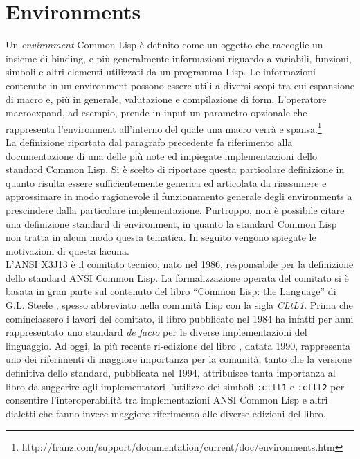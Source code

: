 \section{Environments}

Un \textit{environment} Common Lisp è definito come un oggetto che raccoglie un
insieme di binding, e più generalmente informazioni riguardo a variabili,
funzioni, simboli e altri elementi utilizzati da un programma Lisp. Le
informazioni contenute in un environment possono essere utili a diversi scopi
tra cui espansione di macro e, più in generale, valutazione e compilazione di
form. L’operatore macroexpand, ad esempio, prende in input un parametro
opzionale che rappresenta l’environment all’interno del quale una macro verrà e
spansa.\footnote{http://franz.com/support/documentation/current/doc/environments.htm}\\

La definizione riportata dal paragrafo precedente fa riferimento alla
documentazione di una delle più note ed impiegate implementazioni dello
standard Common Lisp. Si è scelto di riportare questa particolare definizione
in quanto risulta essere sufficientemente generica ed articolata da riassumere
e approssimare in modo ragionevole il funzionamento generale degli environments
a prescindere dalla particolare implementazione. Purtroppo, non è possibile
citare una definizione standard di environment, in quanto la standard Common
Lisp non tratta in alcun modo questa tematica. In seguito vengono spiegate le
motivazioni di questa lacuna.\\

L’ANSI X3J13 è il comitato tecnico, nato nel 1986, responsabile per la
definizione dello standard ANSI Common Lisp. La formalizzazione operata del
comitato si è basata in gran parte sul contenuto del libro “Common Lisp: the
Language” di G.L. Steele \cite{steele1984common}, spesso abbreviato nella
comunità Lisp con la sigla \textit{CLtL1}. Prima che cominciassero i lavori del
comitato, il libro pubblicato nel 1984 ha infatti per anni rappresentato uno
standard \textit{de facto} per le diverse implementazioni del linguaggio. Ad
oggi, la più recente ri-edizione del libro \cite{steele1990common}, datata
1990, rappresenta uno dei riferimenti di maggiore importanza per la comunità,
tanto che la versione definitiva dello standard, pubblicata nel 1994,
attribuisce tanta importanza al libro da suggerire agli implementatori
l’utilizzo dei simboli \texttt{:ctlt1} e \texttt{:ctlt2} per consentire
l’interoperabilità tra implementazioni ANSI Common Lisp e altri dialetti che
fanno invece maggiore riferimento alle diverse edizioni del libro.

